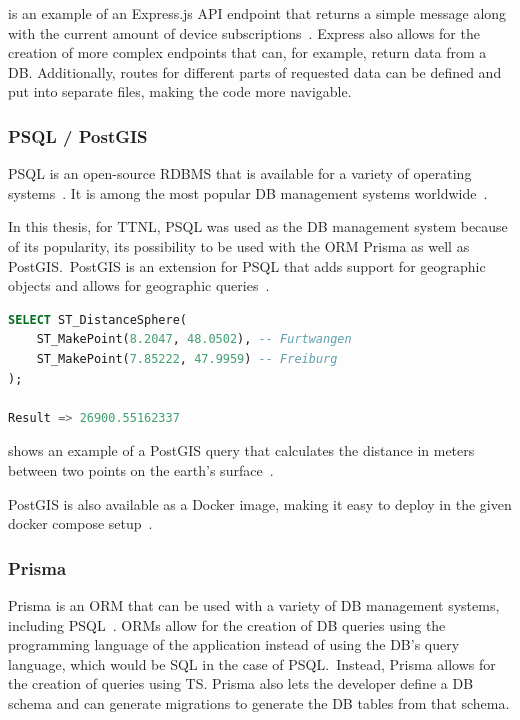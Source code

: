  is an example of an Express.js \ac{API} endpoint that returns a simple message along with the current amount of device subscriptions~\cite{noauthor_express_nodate-1}.
Express also allows for the creation of more complex endpoints that can, for example, return data from a \ac{DB}.
Additionally, routes for different parts of requested data can be defined and put into separate files, making the code more navigable.

\subsubsection{\ac{PSQL} / PostGIS}

\ac{PSQL} is an open-source \ac{RDBMS} that is available for a variety of operating systems~\cite{postgresql_global_development_group_postgresql_2023}.
It is among the most popular \ac{DB} management systems worldwide~\cite{db-engines_most_2023}.

In this thesis, for \ac{TTNL}, \ac{PSQL} was used as the \ac{DB} management system because of its popularity, its possibility to be used with the \ac{ORM} Prisma as well as PostGIS.\
PostGIS is an extension for \ac{PSQL} that adds support for geographic objects and allows for geographic queries~\cite{postgis_psc__osgeo_postgis_2023}.

\begin{lstlisting}[language=SQL, float, caption={Example of a PostGIS query to calculate the distance between two geolocation points in meters}, label={lst:postgis-example-distance}]
SELECT ST_DistanceSphere(
    ST_MakePoint(8.2047, 48.0502), -- Furtwangen
    ST_MakePoint(7.85222, 47.9959) -- Freiburg
);

Result => 26900.55162337
\end{lstlisting}

 shows an example of a PostGIS query that calculates the distance in meters between two points on the earth's surface~\cite{noauthor_st_distancesphere_nodate}.

PostGIS is also available as a Docker image, making it easy to deploy in the given docker compose setup~\cite{docker_inc_postgispostgis_2023}.

\subsubsection{Prisma}

Prisma is an \ac{ORM} that can be used with a variety of \ac{DB} management systems, including \ac{PSQL}~\cite{prisma_data_inc_prisma_2023}.
\acp{ORM} allow for the creation of \ac{DB} queries using the programming language of the application instead of using the \ac{DB}'s query language, which would be \ac{SQL} in the case of \ac{PSQL}.\
Instead, Prisma allows for the creation of queries using \ac{TS}.
Prisma also lets the developer define a \ac{DB} schema and can generate migrations to generate the \ac{DB} tables from that schema.

